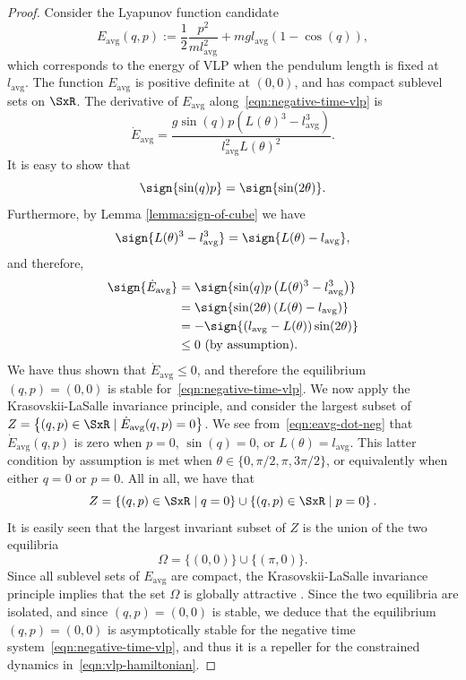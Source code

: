 \begin{proof}
Consider the Lyapunov function candidate
\[
    E_\text{avg}(q,p) := \frac{1}{2}\frac{p^2}{m l_\text{avg}^2} 
        + m g l_\text{avg} (1-\cos(q))
   ,
\]
which corresponds to the energy of VLP when the pendulum length is fixed at
\(l_\text{avg}\). 
The function \(E_\text{avg}\) is positive definite at \((0,0)\), and has compact
sublevel sets on \(\SxR\).  
The derivative of \(E_\text{avg}\) along~\eqref{eqn:negative-time-vlp} is
\begin{equation}\label{eqn:eavg-dot-neg}
   \dot{E}_\text{avg} = \frac{g\sin(q)p \left(L(\theta)^3 -
     l_\text{avg}^3\right)} {l_\text{avg}^2L(\theta)^2}
   .
\end{equation}
It is easy to show that
\[
   \sign{\sin(q)p} = \sign{\sin(2\theta)}
   .
\]
Furthermore, by Lemma \ref{lemma:sign-of-cube} we have
\[ 
    \sign{L(\theta)^3 - l_\text{avg}^3} = \sign{L(\theta) - l_\text{avg}}
    ,
\]
and therefore,
\begin{align}\label{eqn:vlp-proof-neg-inv}
    \sign{\dot{E}_\text{avg}} &= 
       \sign{\sin(q)p \left(L(\theta)^3 - l_\text{avg}^3\right)}
    \nonumber \\
    &= \sign{\sin(2\theta) \left(L(\theta) - l_\text{avg}\right)}
    \nonumber \\
    &= -\sign{(l_\text{avg} - L(\theta))\sin(2\theta)} 
    \nonumber \\
    &\leq 0 \text{ (by assumption)}
   .
\end{align}
We have thus shown that \(\dot{E}_\text{avg} \leq 0\), and therefore
the equilibrium \((q,p)=(0,0)\) is stable for~\eqref{eqn:negative-time-vlp}.
We now apply the Krasovskii-LaSalle invariance principle, and consider the
largest subset of 
\( Z = \left\{(q,p) \in \SxR \mid \dot{E}_\text{avg}(q,p) = 0
\right\} \). 
We see from~\eqref{eqn:eavg-dot-neg}
that \(\dot{E}_\text{avg}(q,p)\) is zero when \(p = 0\), \(\sin(q) = 0\), or
\(L(\theta) = l_\text{avg}\). 
This latter condition by assumption is met when 
\(\theta \in \{0,\pi/2,\pi, 3\pi/2\}\), or equivalently when either 
\(q = 0\) or \(p = 0\). 
All in all, we have that
\[
   Z= \left\{(q,p) \in \SxR \mid q =0\right\} 
   \cup \left\{(q,p) \in \SxR \mid p =0\right\} 
   .
\]
It is easily seen that the largest invariant subset of \(Z\) is the union of the
two equilibria
\[
   \Omega =  \{(0,0)\}\cup \{(\pi,0)\}
   .
\]  
Since all sublevel sets of \(E_\text{avg}\) are compact, the
Krasovskii-LaSalle invariance principle implies that the set
\(\Omega\) is globally attractive \cite{krasovskii_lasalle}. 
Since the two equilibria are isolated, and since \((q,p)=(0,0)\) is stable, we
deduce that the equilibrium \((q,p)=(0,0)\) is asymptotically stable for the
negative time system~\eqref{eqn:negative-time-vlp}, and thus it is a repeller
for the constrained dynamics in~\eqref{eqn:vlp-hamiltonian}.



\end{proof}
